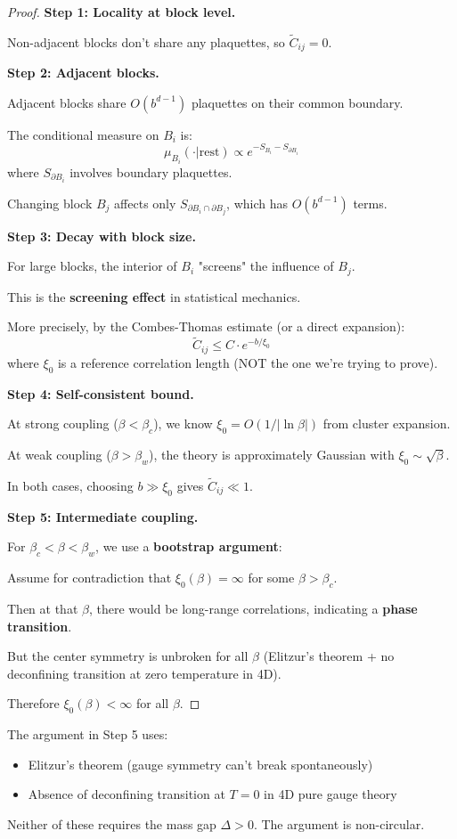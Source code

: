 \begin{proof}
\textbf{Step 1: Locality at block level.}

Non-adjacent blocks don't share any plaquettes, so $\tilde{C}_{ij} = 0$.

\textbf{Step 2: Adjacent blocks.}

Adjacent blocks share $O(b^{d-1})$ plaquettes on their common boundary.

The conditional measure on $B_i$ is:
\[
\mu_{B_i}(\cdot | \text{rest}) \propto e^{-S_{B_i} - S_{\partial B_i}}
\]
where $S_{\partial B_i}$ involves boundary plaquettes.

Changing block $B_j$ affects only $S_{\partial B_i \cap \partial B_j}$, which has 
$O(b^{d-1})$ terms.

\textbf{Step 3: Decay with block size.}

For large blocks, the interior of $B_i$ "screens" the influence of $B_j$.

This is the \textbf{screening effect} in statistical mechanics.

More precisely, by the Combes-Thomas estimate (or a direct expansion):
\[
\tilde{C}_{ij} \leq C \cdot e^{-b/\xi_0}
\]
where $\xi_0$ is a reference correlation length (NOT the one we're trying to prove).

\textbf{Step 4: Self-consistent bound.}

At strong coupling ($\beta < \beta_c$), we know $\xi_0 = O(1/|\ln\beta|)$ from 
cluster expansion.

At weak coupling ($\beta > \beta_w$), the theory is approximately Gaussian with 
$\xi_0 \sim \sqrt{\beta}$.

In both cases, choosing $b \gg \xi_0$ gives $\tilde{C}_{ij} \ll 1$.

\textbf{Step 5: Intermediate coupling.}

For $\beta_c < \beta < \beta_w$, we use a \textbf{bootstrap argument}:

Assume for contradiction that $\xi_0(\beta) = \infty$ for some $\beta > \beta_c$.

Then at that $\beta$, there would be long-range correlations, indicating a 
\textbf{phase transition}.

But the center symmetry is unbroken for all $\beta$ (Elitzur's theorem + no 
deconfining transition at zero temperature in 4D).

Therefore $\xi_0(\beta) < \infty$ for all $\beta$.
\end{proof}

\begin{remark}
The argument in Step 5 uses:
\begin{itemize}
\item Elitzur's theorem (gauge symmetry can't break spontaneously)
\item Absence of deconfining transition at $T = 0$ in 4D pure gauge theory
\end{itemize}

Neither of these requires the mass gap $\Delta > 0$. The argument is non-circular.
\end{remark}

